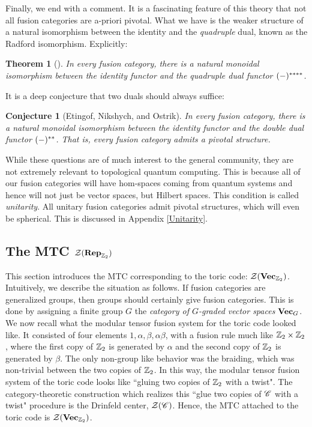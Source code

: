 \documentclass{article}
\newtheorem{theorem}{Theorem}[section]
\newtheorem{conjecture}{Conjecture}[section]
\theoremstyle{definition}
\numberwithin{figure}{section}
\begin{document}
Finally, we end with a comment. It is a fascinating feature of this theory that not all fusion categories are a-priori pivotal. What we have is the weaker structure of a natural isomorphism between the identity and the \textit{quadruple} dual, known as the Radford isomorphism. Explicitly:

\begin{theorem}[\cite{etingof2005fusion}] In every fusion category, there is a natural monoidal isomorphism between the identity functor and the quadruple dual functor $(\--)^{****}$.
\end{theorem}

It is a deep conjecture that two duals should always suffice:

\begin{conjecture}[Etingof, Nikshych, and Ostrik] In every fusion category, there is a natural monoidal isomorphism between the identity functor and the double dual functor $(\--)^{**}$. That is, every fusion category admits a pivotal structure.
\end{conjecture}

While these questions are of much interest to the general community, they are not extremely relevant to topological quantum computing. This is because all of our fusion categories will have hom-spaces coming from quantum systems and hence will not just be vector spaces, but Hilbert spaces. This condition is called \textit{unitarity}. All unitary fusion categories admit pivotal structures, which will even be spherical. This is discussed in Appendix \ref{Unitarity}.

\subsection{The MTC $\mathcal{Z}(\bold{Rep}_{\mathbb{Z}_2})$}
\label{VecZ2 MTC}

This section introduces the MTC corresponding to the toric code: $\mathcal{Z}(\bold{Vec}_{\mathbb{Z}_2})$. Intuitively, we describe the situation as follows. If fusion categories are generalized groups, then groups should certainly give fusion categories. This is done by assigning a finite group $G$ the \textit{category of $G$-graded vector spaces} $\bold{Vec}_G$. We now recall what the modular tensor fusion system for the toric code looked like. It consisted of four elements $1,\alpha,\beta,\alpha\beta$, with a fusion rule much like $\mathbb{Z}_2\times \mathbb{Z}_2$, where the first copy of $\mathbb{Z}_2$ is generated by $\alpha$ and the second copy of $\mathbb{Z}_2$ is generated by $\beta$. The only non-group like behavior was the braiding, which was non-trivial between the two copies of $\mathbb{Z}_2$. In this way, the modular tensor fusion system of the toric code looks like ``gluing two copies of $\mathbb{Z}_2$ with a twist". The category-theoretic construction which realizes this ``glue two copies of $\mathscr{C}$ with a twist" procedure is the Drinfeld center, $\mathcal{Z}(\mathscr{C})$. Hence, the MTC attached to the toric code is $\mathcal{Z}(\bold{Vec}_{\mathbb{Z}_2})$.
\end{document}
